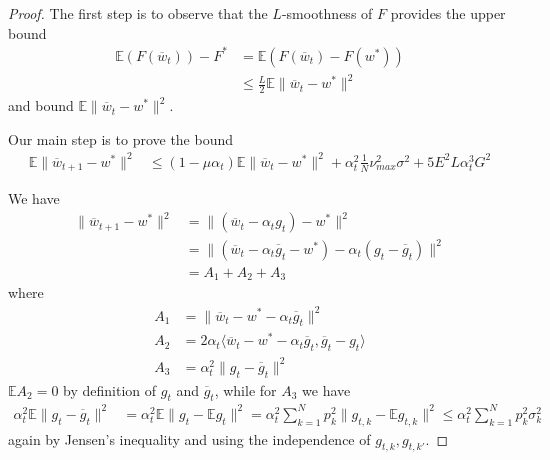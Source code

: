 \begin{proof}
	The first step is to observe that the $L$-smoothness of $F$ provides
	the upper bound
	\begin{align*}
	\mathbb{E}(F(\overline{w}_{t}))-F^{\ast} & =\mathbb{E}(F(\overline{w}_{t})-F(w^{\ast}))\\
	& \leq\frac{L}{2}\mathbb{E}\|\overline{w}_{t}-w^{\ast}\|^{2}
	\end{align*}
	and bound $\mathbb{E}\|\overline{w}_{t}-w^{\ast}\|^{2}$. 
	
	Our main step is to prove the bound 
	\begin{align*}
	\mathbb{E}\|\overline{w}_{t+1}-w^{\ast}\|^{2} & \leq(1-\mu\alpha_{t})\mathbb{E}\|\overline{w}_{t}-w^{\ast}\|^{2}+\alpha_{t}^{2}\frac{1}{N}\nu_{max}^{2}\sigma^{2}+5E^{2}L\alpha_{t}^{3}G^{2}
	\end{align*}
	
	We have 
	\begin{align*}
	\|\overline{w}_{t+1}-w^{\ast}\|^{2} & =\|(\overline{w}_{t}-\alpha_{t}g_{t})-w^{\ast}\|^{2}\\
	& =\|(\overline{w}_{t}-\alpha_{t}\overline{g}_{t}-w^{\ast})-\alpha_{t}(g_{t}-\overline{g}_{t})\|^{2}\\
	& =A_{1}+A_{2}+A_{3}
	\end{align*}
	where 
	\begin{align*}
	A_{1} & =\|\overline{w}_{t}-w^{\ast}-\alpha_{t}\overline{g}_{t}\|^{2}\\
	A_{2} & =2\alpha_{t}\langle\overline{w}_{t}-w^{\ast}-\alpha_{t}\overline{g}_{t},\overline{g}_{t}-g_{t}\rangle\\
	A_{3} & =\alpha_{t}^{2}\|g_{t}-\overline{g}_{t}\|^{2}
	\end{align*}
	$\mathbb{E}A_{2}=0$ by definition of $g_{t}$ and $\overline{g}_{t}$,
	while for $A_{3}$ we have
	\begin{align*}
	\alpha_{t}^{2}\mathbb{E}\|g_{t}-\overline{g}_{t}\|^{2} & =\alpha_{t}^{2}\mathbb{E}\|g_{t}-\mathbb{E}g_{t}\|^{2}=\alpha_{t}^{2}\sum_{k=1}^{N}p_{k}^{2}\|g_{t,k}-\mathbb{E}g_{t,k}\|^{2}\leq\alpha_{t}^{2}\sum_{k=1}^{N}p_{k}^{2}\sigma_{k}^{2}
	\end{align*}
	again by Jensen's inequality and using the independence of $g_{t,k},g_{t,k'}$. 
	

\end{proof}

